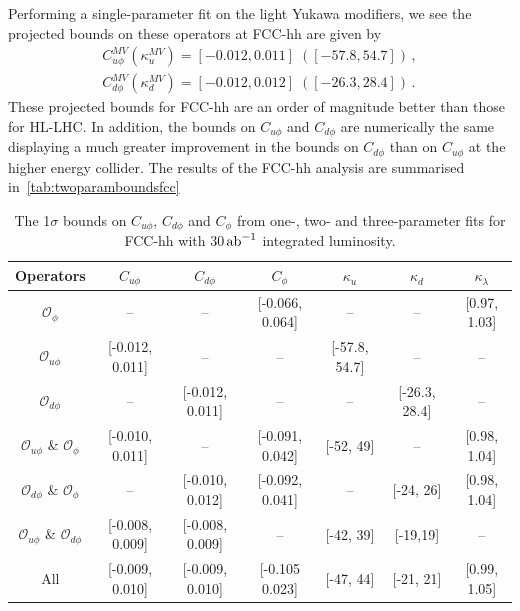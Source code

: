 Performing a single-parameter fit on the light Yukawa modifiers, we see the projected bounds on these operators at FCC-hh are given by
\begin{equation}
	\begin{split}
		C_{u\phi}^{MV} \left(\kappa_u^{MV}\right) = [-0.012, 0.011] \;([-57.8, 54.7])\,,\\
		C_{d\phi}^{MV} (\kappa_d^{MV}) = [-0.012, 0.012] \;([-26.3, 28.4])\,.
	\end{split}
\end{equation}
These projected bounds for FCC-hh are an order of magnitude better than those for HL-LHC. In addition, the bounds on $C_{u\phi}$ and $C_{d\phi}$ are numerically the same displaying a much greater improvement in the bounds on $C_{d\phi}$ than on $C_{u\phi}$ at the higher energy collider.  The results of the FCC-hh analysis are summarised in~\autoref{tab:twoparamboundsfcc}\\
\begin{table}[]
	\centering
	{\footnotesize
		\begin{tabular}{cccc||ccc}
			\toprule
			Operators &  $C_{u\phi}$&   $C_{d\phi}$&   $C_{\phi}$&    $\kappa_{u}$&   $\kappa_{d}$&   $\kappa_\lambda$\\
			\midrule
			$\mathcal O_{\phi}$ &--   & --            &[-0.066, 0.064] &--  & -- &[0.97, 1.03]\\
			$\mathcal O_{u\phi}$&[-0.012, 0.011]   & --            &-- &[-57.8, 54.7]  & -- &--\\
			$\mathcal O_{d\phi}$&--   & [-0.012, 0.011]            &-- &--  & [-26.3, 28.4] &--\\
			$\mathcal O_{u\phi}$ \& $\mathcal O_{\phi}$ &[-0.010, 0.011]  & --            &[-0.091, 0.042] &[-52, 49] & -- &[0.98, 1.04]\\
			$\mathcal O_{d\phi}$ \& $\mathcal O_{\phi}$ & --             &[-0.010, 0.012]  &[-0.092, 0.041]& -- &[-24, 26] &[0.98, 1.04]\\
			$\mathcal O_{u\phi}$ \& $\mathcal O_{d\phi}$&[-0.008, 0.009]&[-0.008, 0.009]& --            &[-42, 39] &[-19,19] & -- \\
			All                                   &[-0.009, 0.010]&[-0.009, 0.010]& [-0.105 0.023]&[-47, 44] &[-21, 21] & [0.99, 1.05] \\
			\bottomrule
		\end{tabular}
	}
	\caption{ The 1$\sigma$ bounds on $C_{u\phi}$, $C_{d\phi}$ and $C_\phi$ from one-, two- and three-parameter fits for  FCC-hh with 30$\,{\rm ab}^{-1}$ integrated luminosity.}
	\label{tab:twoparamboundsfcc}
\end{table}
